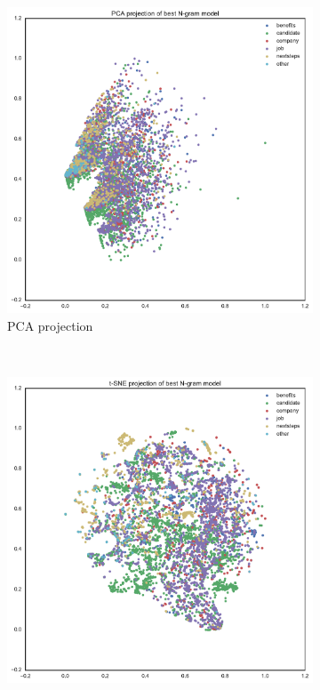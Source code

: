 \begin{figure}[h]
    \centering
    \begin{subfigure}[b]{0.47\textwidth}
      \includegraphics[width=\textwidth]{img/exp-vector-space-ngram-pca.pdf}
      \caption{PCA projection}
      \label{fig:exp-vector-space-ngram-pca}
    \end{subfigure}
    ~
    \begin{subfigure}[b]{0.48\textwidth}
      \includegraphics[width=\textwidth]{img/exp-vector-space-ngram-tsne.pdf}

\end{subfigure}
\end{figure}
